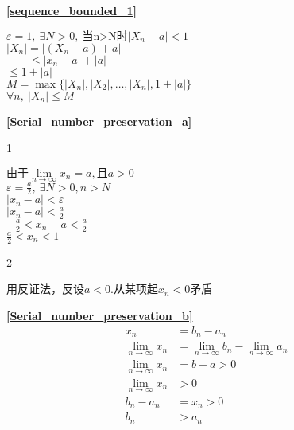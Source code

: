 \textbf{\large \ref{sequence_bounded_1}}
    \begin{center}
       $\varepsilon =1,\ \exists N>0,\ \mbox{当n>N时}\left|X_n-a\right|<1$\\
        $\left|X_n\right|=\left|(X_n-a)+a\right|$\\
        $\qquad\leqslant \left|x_n-a\right|+\left|a\right|$\\
        $\leqslant 1+\left|a\right|$\\
        $M=\max\{\left|X_n\right|,\left|X_2\right|,\dots,\left|X_n\right|,1+\left|a\right|\}$\\
        $\forall n,\ \left|X_n\right|\leqslant M$
    \end{center}
\textbf{\large \ref{Serial_number_preservation_a}}
    \begin{center}1\end{center}
    $\mbox{由于}\lim\limits_{n\to\infty}x_n = a,\mbox{且}a>0$\\
    $\varepsilon = \frac{a}{2},\ \exists N>0,n>N$\\
    $\left|x_n-a\right|<\varepsilon$\\
    $\left|x_n-a\right|<\frac{a}{2}$\\
    $-\frac{a}{2}<x_n-a<\frac{a}{2}$\\
    $\frac{a}{2}<x_n<1$
    \begin{center}2\end{center}
    用反证法，反设$a<0$.从某项起$x_n<0$矛盾

\textbf{\large \ref{Serial_number_preservation_b}}
\begin{displaymath}
    \begin{split}
        x_n&=b_n-a_n\\
        \lim\limits_{n\to\infty} x_n &= \lim\limits_{n\to\infty} b_n-\lim\limits_{n\to\infty}a_n\\
        \lim\limits_{n\to\infty} x_n &=b-a>0\\
        \lim\limits_{n\to\infty} x_n &>0 \\
        b_n-a_n&=x_n > 0\\
        b_n&>a_n
    \end{split}
\end{displaymath}

